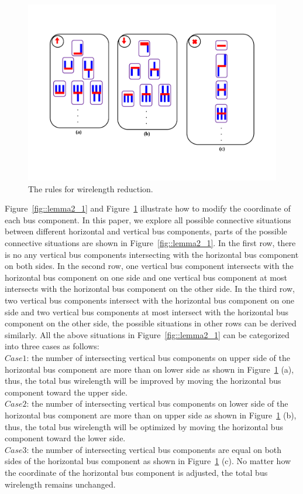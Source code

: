 \begin{figure}[htb]
  \centering
    \includegraphics[width=14cm]{Fig/lemma2_2.pdf}
     \caption{
      \small
       The rules for wirelength reduction.
   }
  \label{fig::lemma2_2}
\end{figure}

Figure~\ref{fig::lemma2_1} and Figure~\ref{fig::lemma2_2} illustrate how to modify the coordinate of each bus component.
In this paper, we explore all possible connective situations between different horizontal and vertical
bus components, parts of the possible connective situations are shown in Figure~\ref{fig::lemma2_1}. In the first row,
there is no any vertical bus components intersecting with the horizontal bus component on both sides.
In the second row, one vertical bus component intersects with the horizontal bus component on one side and one
vertical bus component at most intersects with the horizontal bus component on the other side.
In the third row, two vertical bus components intersect with the horizontal bus component on one side and two
vertical bus components at most intersect with the horizontal bus component on the other side,
the possible situations in other rows can be derived similarly.
All the above situations in Figure~\ref{fig::lemma2_1} can be categorized into three cases as follows:\\
\indent $Case1$: the number of intersecting vertical bus components on upper side of the horizontal bus component
are more than on lower side as shown in Figure~\ref{fig::lemma2_2} (a), thus, the total bus wirelength
will be improved by moving the horizontal bus component toward the upper side.\\
\indent $Case2$: the number of intersecting vertical bus components on lower side of the horizontal bus component
are more than on upper side as shown in Figure~\ref{fig::lemma2_2} (b), thus, the total bus wirelength
will be optimized by moving the horizontal bus component toward the lower side.\\
\indent $Case3$: the number of intersecting vertical bus components are equal on both sides of the horizontal bus component
as shown in Figure~\ref{fig::lemma2_2} (c). No matter how the coordinate of the horizontal bus component is adjusted,
the total bus wirelength remains unchanged.\\

